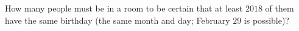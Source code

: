How many people must be in a room to be certain that at least $2018$ of them have the same birthday (the same month and day; February $29$ is possible)?
